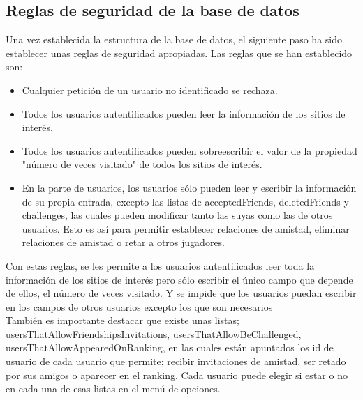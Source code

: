 \documentclass{report}
\begin{document}
\subsection{Reglas de seguridad de la base de datos}
Una vez establecida la estructura de la base de datos, el siguiente paso ha sido establecer unas reglas de seguridad apropiadas. Las reglas que se han establecido son:
\begin{itemize}
\item Cualquier petición de un usuario no identificado se rechaza.
\item Todos los usuarios autentificados pueden leer la información de los sitios de interés.
\item Todos los usuarios autentificados pueden sobreescribir el valor de la propiedad "número de veces visitado" de todos los sitios de interés.
\item En la parte de usuarios, los usuarios sólo pueden leer y escribir la información de su propia entrada, excepto las listas de acceptedFriends, deletedFriends y challenges, las cuales pueden modificar tanto las suyas como las de otros usuarios. Esto es así para permitir establecer relaciones de amistad, eliminar relaciones de amistad o retar a otros jugadores.
\end{itemize}
Con estas reglas, se les permite a los usuarios autentificados leer toda la información de los sitios de interés pero sólo escribir el único campo que depende de ellos, el número de veces visitado. Y se impide que los usuarios puedan escribir en los campos de otros usuarios excepto los que son necesarios\\
También es importante destacar que existe unas listas; usersThatAllowFriendshipsInvitations, usersThatAllowBeChallenged, usersThatAllowAppearedOnRanking, en las cuales están apuntados los id de usuario de cada usuario que permite; recibir invitaciones de amistad, ser retado por sus amigos o aparecer en el ranking. Cada usuario puede elegir si estar o no en cada una de esas listas en el menú de opciones.
\end{document}
